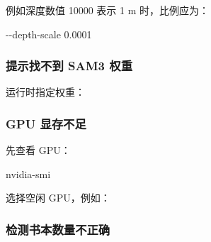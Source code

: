 \documentclass[
  chinese,
  11pt,
  a4paper,
]{article}
\newenvironment{Shaded}{\begin{snugshade}}{\end{snugshade}}
\newcommand{\AttributeTok}[1]{\textcolor[rgb]{0.13,0.29,0.53}{#1}}
\newcommand{\DataTypeTok}[1]{\textcolor[rgb]{0.13,0.29,0.53}{#1}}
\newcommand{\ExtensionTok}[1]{#1}
\newcommand{\NormalTok}[1]{#1}
\newcommand{\OperatorTok}[1]{\textcolor[rgb]{0.81,0.36,0.00}{\textbf{#1}}}
\newcommand{\StringTok}[1]{\textcolor[rgb]{0.31,0.60,0.02}{#1}}
\newcommand{\VariableTok}[1]{\textcolor[rgb]{0.00,0.00,0.00}{#1}}
\begin{document}
例如深度数值 10000 表示 1 m 时，比例应为：

\begin{Shaded}
\begin{Highlighting}[]
\ExtensionTok{{-}{-}depth{-}scale}\NormalTok{ 0.0001}
\end{Highlighting}
\end{Shaded}

\subsubsection{提示找不到 SAM3
权重}\label{ux63d0ux793aux627eux4e0dux5230-sam3-ux6743ux91cd}

运行时指定权重：

\begin{Shaded}
\end{Shaded}

\subsubsection{GPU 显存不足}\label{gpu-ux663eux5b58ux4e0dux8db3}

先查看 GPU：

\begin{Shaded}
\begin{Highlighting}[]
\ExtensionTok{nvidia{-}smi}
\end{Highlighting}
\end{Shaded}

选择空闲 GPU，例如：

\begin{Shaded}
\end{Shaded}

\subsubsection{检测书本数量不正确}\label{ux68c0ux6d4bux4e66ux672cux6570ux91cfux4e0dux6b63ux786e}
\end{document}

